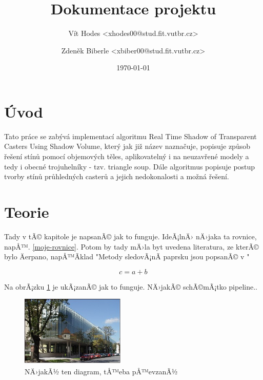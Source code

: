 \documentclass[a4paper, 12pt]{article}
\title{Dokumentace projektu}
\author{Vít Hodes <xhodes00@stud.fit.vutbr.cz>}
\author{Zdeněk Biberle <xbiber00@stud.fit.vutbr.cz>}
\date{\today}
\begin{document}
\maketitle

\section{Úvod}


Tato práce se zabývá implementací algoritmu Real Time Shadow of Transparent Casters Using Shadow
Volume, který jak již název naznačuje, popisuje způsob řešení stínů pomocí objemových těles, aplikovatelný i
na neuzavřené modely a tedy i obecné trojuhelníky - tzv. triangle soup. Dále algoritmus popisuje
postup tvorby stínů průhledných casterů a jejich nedokonalosti a možná řešení.


\section{Teorie}

Tady v tÃ© kapitole je napsanÃ© jak to funguje. IdeÃ¡lnÄ› nÄ›jaka ta rovnice, napÅ™. \ref{moje-rovnice}. Potom by
tady mÄ›la byt uvedena literatura, ze kterÃ© bylo Äerpano, napÅ™Ã­klad "Metody sledovÃ¡nÃ­ paprsku jsou popsanÃ© v \cite{Byungmoon2007}"


\begin{equation}
  \label{moje-rovnice}
  c = a + b
\end{equation}

Na obrÃ¡zku \ref{fig:obrazek} je ukÃ¡zanÃ© jak to funguje. NÄ›jakÃ© schÃ©mÃ¡tko pipeline..

\begin{figure}[htb]
  \centering
  \includegraphics[width=5cm,keepaspectratio]{obrazek.jpg}
  \caption{NÄ›jakÃ½ ten diagram, tÅ™eba pÅ™evzanÃ½ }
  \label{fig:obrazek}
\end{figure}

\end{document}

